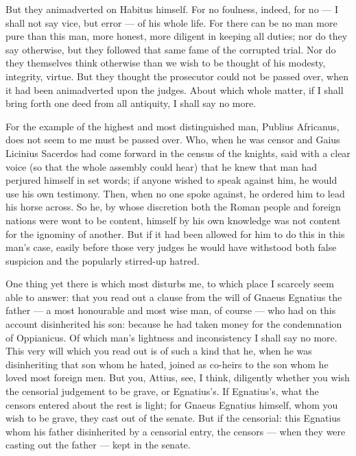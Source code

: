  But they animadverted on Habitus himself. For no foulness, indeed, for no --- I shall not say vice, but error --- of his whole life. For there can be no man more pure than this man, more honest, more diligent in keeping all duties; nor do they say otherwise, but they followed that same fame of the corrupted trial. Nor do they themselves think otherwise than we wish to be thought of his modesty, integrity, virtue. But they thought the prosecutor could not be passed over, when it had been animadverted upon the judges. About which whole matter, if I shall bring forth one deed from all antiquity, I shall say no more.

 For the example of the highest and most distinguished man, Publius Africanus, does not seem to me must be passed over. Who, when he was censor and Gaius Licinius Sacerdos had come forward in the census of the knights, said with a clear voice (so that the whole assembly could hear) that he knew that man had perjured himself in set words; if anyone wished to speak against him, he would use his own testimony. Then, when no one spoke against, he ordered him to lead his horse across. So he, by whose discretion both the Roman people and foreign nations were wont to be content, himself by his own knowledge was not content for the ignominy of another. But if it had been allowed for him to do this in this man's case, easily before those very judges he would have withstood both false suspicion and the popularly stirred-up hatred.

 One thing yet there is which most disturbs me, to which place I scarcely seem able to answer: that you read out a clause from the will of Gnaeus Egnatius the father --- a most honourable and most wise man, of course --- who had on this account disinherited his son: because he had taken money for the condemnation of Oppianicus. Of which man's lightness and inconsistency I shall say no more. This very will which you read out is of such a kind that he, when he was disinheriting that son whom he hated, joined as co-heirs to the son whom he loved most foreign men. But you, Attius, see, I think, diligently whether you wish the censorial judgement to be grave, or Egnatius's. If Egnatius's, what the censors entered about the rest is light; for Gnaeus Egnatius himself, whom you wish to be grave, they cast out of the senate. But if the censorial: this Egnatius whom his father disinherited by a censorial entry, the censors --- when they were casting out the father --- kept in the senate.

